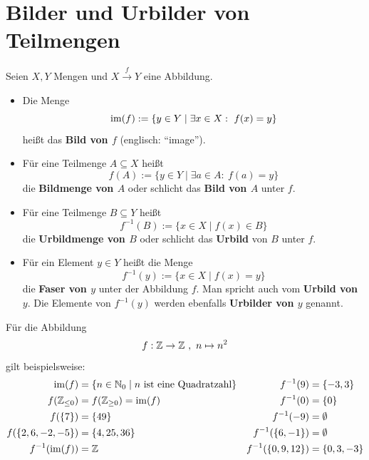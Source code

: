 \section{Bilder und Urbilder von Teilmengen}


\begin{defin} \label{def:bildmenge}   
    Seien $X,Y$ Mengen und $X \xrightarrow{f} Y$ eine Abbildung.
    \begin{itemize}
        \item Die Menge
            \[ \operatorname{im}(f) := \{y\in Y\mid \exists x\in X:\ f(x)=y  \} \]
        heißt das \textbf{Bild von $f$} (englisch: ``image'').
        \item Für eine Teilmenge $A\subseteq X$ heißt
            \[ f(A) := \{ y \in Y \mid \exists a\in A:\ f(a)=y \} \]
        die \textbf{Bildmenge von $A$} oder schlicht das \textbf{Bild von $A$} unter $f$.
        \item Für eine Teilmenge $B\subseteq Y$ heißt
            \[ f^{-1}(B) := \{ x \in X \mid f(x)\in B \} \]
        die \textbf{Urbildmenge von $B$} oder schlicht das \textbf{Urbild} von $B$ unter $f$.
        \item Für ein Element $y\in Y$ heißt die Menge
            \[ f^{-1}(y) := \{ x\in X \mid f(x)=y \} \]
        die \textbf{Faser von $y$} unter der Abbildung $f$. Man spricht auch vom \textbf{Urbild von $y$}. Die Elemente von $f^{-1}(y)$ werden ebenfalls \textbf{Urbilder von $y$} genannt.
    \end{itemize}
\end{defin}


\begin{bsp}
    Für die Abbildung
    \begin{align*}
        f: \mathbb Z \to \mathbb Z \ ,\ n \mapsto n^2
    \end{align*}
    gilt beispielsweise:
    \begin{align*}
        \operatorname{im}(f) & = \{n\in \mathbb N_0 \mid n\ \text{ist eine Quadratzahl} \} & f^{-1}(9) & = \{-3,3\} \\
        f(\mathbb Z_{\le 0}) & = f(\mathbb Z_{\ge 0}) = \operatorname{im}(f) & f^{-1}(0) & = \{0\} \\
        f(\{7\}) & = \{49\} & f^{-1}(-9) & = \emptyset \\
        f(\{2,6,-2,-5\}) & = \{4,25,36\} & f^{-1}(\{6,-1\}) & = \emptyset \\
        f^{-1}(\operatorname{im}(f)) & = \mathbb Z & f^{-1}(\{0,9,12\}) & = \{0,3,-3\}
    \end{align*}
\end{bsp}


